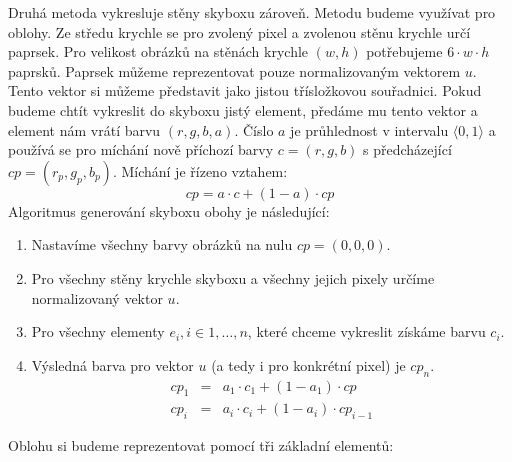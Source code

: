 Druhá metoda vykresluje stěny skyboxu zároveň.
Metodu budeme využívat pro oblohy.
Ze středu krychle se pro zvolený pixel a zvolenou stěnu krychle určí paprsek.
Pro velikost obrázků na stěnách krychle $(w,h)$ potřebujeme $6 \cdot w \cdot h$ paprsků.
Paprsek můžeme reprezentovat pouze normalizovaným vektorem $u$.
Tento vektor si můžeme představit jako jistou třísložkovou souřadnici.
Pokud budeme chtít vykreslit do skyboxu jistý element, předáme mu tento vektor a element nám vrátí barvu $(r,g,b,a)$.
Číslo $a$ je průhlednost v intervalu $\langle 0,1 \rangle$ a používá se pro míchání nově příchozí barvy $c=(r,g,b)$ s předcházející $cp=(r_p,g_p,b_p)$.
Míchání je řízeno vztahem:
\begin{equation}
cp=a \cdot c + (1-a) \cdot cp
\end{equation}
Algoritmus generování skyboxu obohy je následující:
\begin{enumerate}
\item Nastavíme všechny barvy obrázků na nulu $cp=(0,0,0)$.
\item Pro všechny stěny krychle skyboxu a všechny jejich pixely určíme normalizovaný vektor $u$.
\item Pro všechny elementy $e_i, i \in {1,\dotsc,n}$, které chceme vykreslit získáme barvu $c_i$.
\item Výsledná barva pro vektor $u$ (a tedy i pro konkrétní pixel) je $cp_n$.
\begin{eqnarray*}
\label{eq:fastindex}
cp_{1}   &=& a_{1} \cdot c_{1} + (1-a_1) \cdot cp     \\
cp_{i} &=& a_{i} \cdot c_{i} + (1-a_i) \cdot cp_{i-1}
\end{eqnarray*}
\end{enumerate}

Oblohu si budeme reprezentovat pomocí tři základní elementů:

